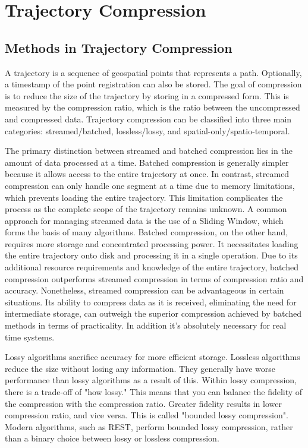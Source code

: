 \section{Trajectory Compression}
\label{sec:traj}
\subsection{Methods in Trajectory Compression}
A trajectory is a sequence of geospatial points that represents a path. Optionally, a timestamp of the point registration can also be stored. The goal of compression is to reduce the size of the trajectory by storing in a compressed form. This is measured by the compression ratio, which is the ratio between the uncompressed and compressed data. Trajectory compression can be classified into three main categories: streamed/batched, lossless/lossy, and spatial-only/spatio-temporal.

The primary distinction between streamed and batched compression lies in the amount of data processed at a time. Batched compression is generally simpler because it allows access to the entire trajectory at once. In contrast, streamed compression can only handle one segment at a time due to memory limitations, which prevents loading the entire trajectory. This limitation complicates the process as the complete scope of the trajectory remains unknown. A common approach for managing streamed data is the use of a Sliding Window, which forms the basis of many algorithms. Batched compression, on the other hand, requires more storage and concentrated processing power. It necessitates loading the entire trajectory onto disk and processing it in a single operation. Due to its additional resource requirements and knowledge of the entire trajectory, batched compression outperforms streamed compression in terms of compression ratio and accuracy. Nonetheless, streamed compression can be advantageous in certain situations. Its ability to compress data as it is received, eliminating the need for intermediate storage, can outweigh the superior compression achieved by batched methods in terms of practicality. In addition it's absolutely necessary for real time systems.%

Lossy algorithms sacrifice accuracy for more efficient storage. Lossless algorithms reduce the size without losing any information. They generally have worse performance than lossy algorithms as a result of this. Within lossy compression, there is a trade-off of "how lossy." This means that you can balance the fidelity of the compression with the compression ratio. Greater fidelity results in lower compression ratio, and vice versa. This is called "bounded lossy compression". Modern algorithms, such as REST, perform bounded lossy compression, rather than a binary choice between lossy or lossless compression.

